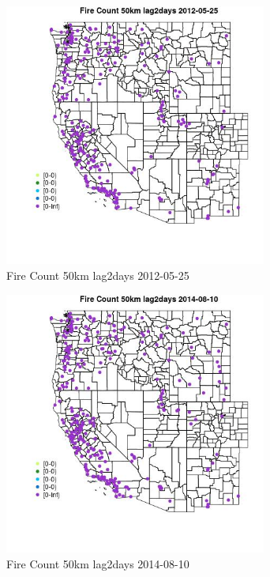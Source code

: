 \begin{figure} 
\centering  
\includegraphics[width=0.77\textwidth]{Code_Outputs/Report_ML_input_PM25_Step4_part_e_de_duplicated_aves_compiled_2019-05-18wNAs_MapObsFire_Count_50km_lag2days2012-05-25.jpg} 
\caption{\label{fig:Report_ML_input_PM25_Step4_part_e_de_duplicated_aves_compiled_2019-05-18wNAsMapObsFire_Count_50km_lag2days2012-05-25}Fire Count 50km lag2days 2012-05-25} 
\end{figure} 
 

\begin{figure} 
\centering  
\includegraphics[width=0.77\textwidth]{Code_Outputs/Report_ML_input_PM25_Step4_part_e_de_duplicated_aves_compiled_2019-05-18wNAs_MapObsFire_Count_50km_lag2days2014-08-10.jpg} 
\caption{\label{fig:Report_ML_input_PM25_Step4_part_e_de_duplicated_aves_compiled_2019-05-18wNAsMapObsFire_Count_50km_lag2days2014-08-10}Fire Count 50km lag2days 2014-08-10} 
\end{figure} 
 

